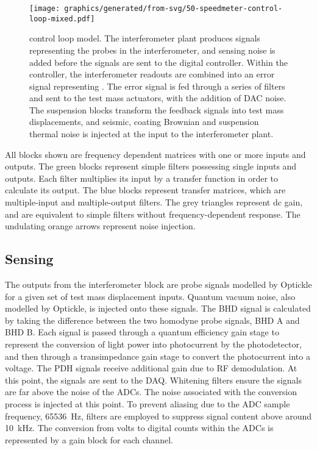 \begin{figure}
  \texttt{[image: graphics/generated/from-svg/50-speedmeter-control-loop-mixed.pdf]}
  \caption{\label{fig:ssm-control-loop-mixed}\SSM{} control loop model. The interferometer plant produces signals representing the probes in the interferometer, and sensing noise is added before the signals are sent to the digital controller. Within the controller, the interferometer readouts are combined into an error signal representing \LMINUS{}. The error signal is fed through a series of filters and sent to the test mass actuators, with the addition of DAC noise. The suspension blocks transform the feedback signals into test mass displacements, and seismic, coating Brownian and suspension thermal noise is injected at the input to the interferometer plant.}
\end{figure}

All blocks shown are frequency dependent matrices with one or more inputs and outputs. The green blocks represent simple filters possessing single inputs and outputs. Each filter multiplies its input by a transfer function in order to calculate its output. The blue blocks represent transfer matrices, which are multiple-input and multiple-output filters. The grey triangles represent dc gain, and are equivalent to simple filters without frequency-dependent response. The undulating orange arrows represent noise injection.

\subsection{Sensing}

The outputs from the interferometer block are probe signals modelled by Optickle for a given set of test mass displacement inputs. Quantum vacuum noise, also modelled by Optickle, is injected onto these signals. The BHD signal is calculated by taking the difference between the two homodyne probe signals, BHD A and BHD B. Each signal is passed through a quantum efficiency gain stage to represent the conversion of light power into photocurrent by the photodetector, and then through a transimpedance gain stage to convert the photocurrent into a voltage. The PDH signals receive additional gain due to RF demodulation. At this point, the signals are sent to the DAQ. Whitening filters ensure the signals are far above the noise of the ADCs. The noise associated with the conversion process is injected at this point. To prevent aliasing due to the ADC sample frequency, \SI{65536}{\hertz}, filters are employed to suppress signal content above around \SI{10}{\kilo\hertz}. The conversion from volts to digital counts within the ADCs is represented by a gain block for each channel.

